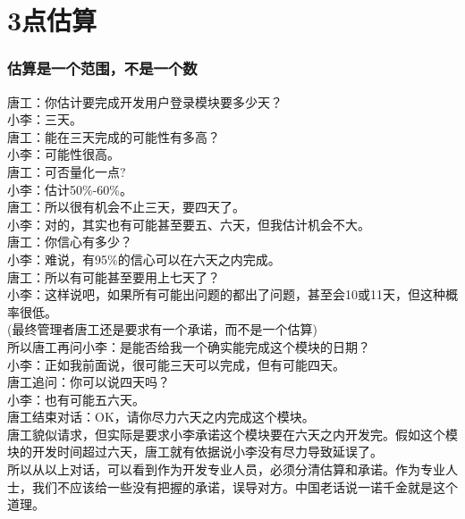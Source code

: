 \chapter{3点估算} %







\hypertarget{ux4f30ux7b97ux662fux4e00ux4e2aux8303ux56f4ux4e0dux662fux4e00ux4e2aux6570}{%
\subsection{估算是一个范围，不是一个数}\label{ux4f30ux7b97ux662fux4e00ux4e2aux8303ux56f4ux4e0dux662fux4e00ux4e2aux6570}}

唐工：你估计要完成开发用户登录模块要多少天？\\
小李：三天。\\
唐工：能在三天完成的可能性有多高？\\
小李：可能性很高。\\
唐工：可否量化一点?\\
小李：估计50\%-60\%。\\
唐工：所以很有机会不止三天，要四天了。\\
小李：对的，其实也有可能甚至要五、六天，但我估计机会不大。\\
唐工：你信心有多少？\\
小李：难说，有95\%的信心可以在六天之内完成。\\
唐工：所以有可能甚至要用上七天了？\\
小李：这样说吧，如果所有可能出问题的都出了问题，甚至会10或11天，但这种概率很低。\\
(最终管理者唐工还是要求有一个承诺，而不是一个估算)\\
所以唐工再问小李：是能否给我一个确实能完成这个模块的日期？\\
小李：正如我前面说，很可能三天可以完成，但有可能四天。\\
唐工追问：你可以说四天吗？\\
小李：也有可能五六天。\\
唐工结束对话：OK，请你尽力六天之内完成这个模块。\\
唐工貌似请求，但实际是要求小李承诺这个模块要在六天之内开发完。假如这个模块的开发时间超过六天，唐工就有依据说小李没有尽力导致延误了。\\
所以从以上对话，可以看到作为开发专业人员，必须分清估算和承诺。作为专业人士，我们不应该给一些没有把握的承诺，误导对方。中国老话说一诺千金就是这个道理。

